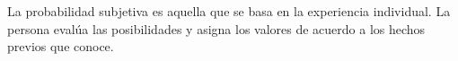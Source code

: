 \noindent La probabilidad subjetiva es aquella que se basa en la experiencia individual. La persona evalúa las posibilidades y asigna los valores de acuerdo a los hechos previos que conoce.